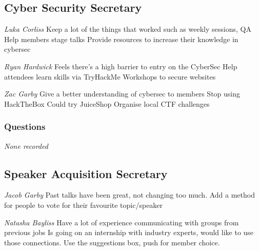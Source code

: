 \documentclass[11pt]{meetingmins}
\begin{document}
\subsection{Cyber Security Secretary}
\begin{items}
	\item
	\textit{Luka Corliss}
		\subitem
		Keep a lot of the things that worked such as weekly sessions, QA
		\subitem
		Help members stage talks
		\subitem
		Provide resources to increase their knowledge in cybersec
		
	\item
	\textit{Ryan Hardwick}
		\subitem
		Feels there’s a high barrier to entry on the CyberSec
		\subitem
		Help attendees learn skills via TryHackMe
		\subitem
		Workshops to secure websites
	
	\item
	\textit{Zac Garby}
		\subitem
		Give a better understanding of cybersec to members
		\subitem
		Stop using HackTheBox
		\subitem
		Could try JuiceShop
		\subitem
		Organise local CTF challenges
\end{items}

\subsubsection{Questions}
\textit{None recorded}

\subsection{Speaker Acquisition Secretary}
\begin{items}
	\item
	\textit{Jacob Garby}
		\subitem
		Past talks have been great, not changing too much.
		\subitem
		Add a method for people to vote for their favourite topic/speaker
	
	\item
	\textit{Natasha Bayliss}	
		\subitem
		Have a lot of experience communicating with groups from previous jobs
		\subitem
		Is going on an internship with industry experts, would like to use those connections.
		\subitem
		Use the suggestions box, push for member choice.
\end{items}
\end{document}
